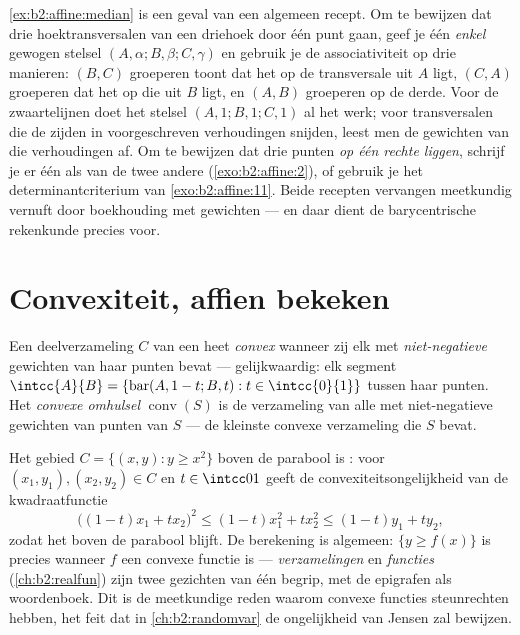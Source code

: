\begin{remark}
\cref{ex:b2:affine:median} is een geval van een algemeen recept. Om
te bewijzen dat drie hoektransversalen van een driehoek door één
punt gaan, geef je één \emph{enkel} gewogen stelsel $(A, \alpha; B,
\beta; C, \gamma)$ en gebruik je de associativiteit op drie
manieren: $(B, C)$ groeperen toont dat het  op de
transversale uit $A$ ligt, $(C, A)$ groeperen dat het op die uit
$B$ ligt, en $(A, B)$ groeperen op de derde. Voor de zwaartelijnen
doet het stelsel $(A, 1; B, 1; C, 1)$ al het werk; voor
transversalen die de zijden in voorgeschreven verhoudingen snijden,
leest men de gewichten van die verhoudingen af. Om te bewijzen dat
drie punten \emph{op één rechte liggen}, schrijf je er één als
 van de twee andere (\cref{exo:b2:affine:2}), of gebruik
je het determinantcriterium van \cref{exo:b2:affine:11}. Beide
recepten vervangen meetkundig vernuft door boekhouding met
gewichten --- en daar dient de barycentrische rekenkunde precies
voor.
\end{remark}

\section{Convexiteit, affien bekeken}

\begin{definition}\label{def:b2:affine:convex}
Een deelverzameling $C$ van een  heet
\emph{convex} wanneer zij elk
 met \emph{niet-negatieve} gewichten van haar punten
bevat --- gelijkwaardig: elk segment $\intcc{A}{B} =
\{\operatorname{bar}(A, 1-t; B, t) : t \in \intcc{0}{1}\}$ tussen
haar punten. Het \emph{convexe omhulsel}
$\operatorname{conv}(S)$ is de verzameling van alle  met
niet-negatieve gewichten van punten van $S$ --- de kleinste convexe
verzameling die $S$ bevat.
\end{definition}

\begin{example}\label{ex:b2:affine:epigraph}
Het gebied $C = \{(x, y) : y \geq x^2\}$ boven de parabool is
: voor $(x_1, y_1), (x_2, y_2) \in C$ en $t \in \intcc01$
geeft de convexiteitsongelijkheid van de kwadraatfunctie
\[
\bigl((1-t)x_1 + tx_2\bigr)^2 \leq (1-t)x_1^2 + tx_2^2
\leq (1-t)y_1 + ty_2 ,
\]
zodat het  boven de parabool blijft. De berekening is
algemeen: $\{y \geq f(x)\}$ is  precies wanneer $f$ een
convexe functie is ---  \emph{verzamelingen} en 
\emph{functies} (\cref{ch:b2:realfun}) zijn twee gezichten van één
begrip, met de epigrafen als woordenboek. Dit is de meetkundige
reden waarom convexe functies steunrechten hebben, het feit dat in
\cref{ch:b2:randomvar} de ongelijkheid van Jensen zal bewijzen.
\end{example}

